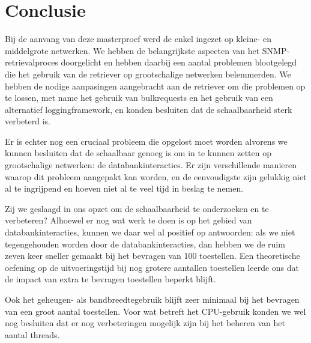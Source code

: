\chapter*{Conclusie}

Bij de aanvang van deze masterproef werd de \nwmretriever{} enkel ingezet op kleine- en middelgrote netwerken.
We hebben de belangrijkste aspecten van het SNMP-retrievalproces doorgelicht en hebben daarbij een aantal problemen blootgelegd die
het gebruik van de retriever op grootschalige netwerken belemmerden.
We hebben de nodige aanpasingen aangebracht aan de retriever om die problemen op te lossen,
met name het gebruik van bulkrequests en het gebruik van een alternatief loggingframework,
en konden besluiten dat de schaalbaarheid sterk verbeterd is.

Er is echter nog een cruciaal probleem die opgelost moet worden alvorens we kunnen besluiten dat de \nwmretriever{} schaalbaar genoeg is om in te kunnen zetten op grootschalige netwerken: de databankinteracties.
Er zijn verschillende manieren waarop dit probleem aangepakt kan worden,
en de eenvoudigste zijn gelukkig niet al te ingrijpend en hoeven niet al te veel tijd in beslag te nemen.

Zij we geslaagd in ons opzet om de schaalbaarheid te onderzoeken en te verbeteren?
Alhoewel er nog wat werk te doen is op het gebied van databankinteracties, kunnen we daar wel al positief op antwoorden:
als we niet tegengehouden worden door de databankinteracties, dan hebben we de \nwmretriever{} ruim zeven keer sneller gemaakt bij het bevragen van 100 toestellen.
Een theoretische oefening op de uitvoeringstijd bij nog grotere aantallen toestellen leerde ons dat de impact van extra te bevragen toestellen beperkt blijft.

Ook het geheugen- als bandbreedtegebruik blijft zeer minimaal bij het bevragen van een groot aantal toestellen.
Voor wat betreft het CPU-gebruik konden we wel nog besluiten dat er nog verbeteringen mogelijk zijn bij het beheren van het aantal threads.


